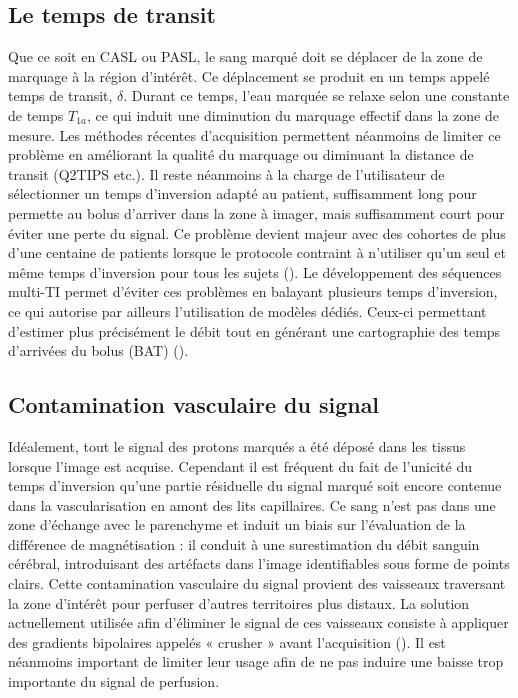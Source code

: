 \subsection{Le temps de transit}
Que ce soit en CASL ou PASL, le sang marqué doit se déplacer de la zone de marquage à la
région d’intérêt. Ce déplacement se produit en un temps appelé temps de transit, $\delta$. Durant ce temps,
l’eau marquée se relaxe selon une constante de temps $T_{1a}$, ce qui induit une diminution du marquage
effectif dans la zone de mesure. Les méthodes récentes d’acquisition permettent néanmoins de limiter
ce problème en améliorant la qualité du marquage ou diminuant la distance de transit (Q2TIPS etc.). Il
reste néanmoins à la charge de l’utilisateur de sélectionner un temps d’inversion adapté au patient,
suffisamment long pour permette au bolus d’arriver dans la zone à imager, mais suffisamment court
pour éviter une perte du signal. Ce problème devient majeur avec des cohortes de plus d’une centaine
de patients lorsque le protocole contraint à n’utiliser qu’un seul et même temps d’inversion pour tous
les sujets (\cite{Deverdun2015}). Le développement des séquences multi-TI permet d’éviter ces problèmes en balayant
plusieurs temps d’inversion, ce qui autorise par ailleurs l’utilisation de modèles dédiés. Ceux-ci
permettant d’estimer plus précisément le débit tout en générant une cartographie des temps
d’arrivées du bolus (BAT) (\cite{Chappell2009}).
\subsection{Contamination vasculaire du signal}
Idéalement, tout le signal des protons marqués a été déposé dans les tissus lorsque l’image est
acquise. Cependant il est fréquent du fait de l’unicité du temps d’inversion qu’une partie résiduelle du
signal marqué soit encore contenue dans la vascularisation en amont des lits capillaires. Ce sang n’est
pas dans une zone d’échange avec le parenchyme et induit un biais sur l’évaluation de la différence de
magnétisation : il conduit à une surestimation du débit sanguin cérébral, introduisant des artéfacts
dans l’image identifiables sous forme de points clairs. Cette contamination vasculaire du signal
provient des vaisseaux traversant la zone d’intérêt pour perfuser d’autres territoires plus distaux. La
solution actuellement utilisée afin d’éliminer le signal de ces vaisseaux consiste à appliquer des
gradients bipolaires appelés « crusher » avant l’acquisition (\cite{Ye1997}). Il est néanmoins important de limiter
leur usage afin de ne pas induire une baisse trop importante du signal de perfusion.\\
